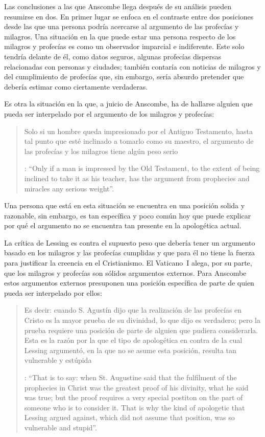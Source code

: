 Las conclusiones a las que Anscombe llega después de su análisis pueden resumirse en dos. En primer lugar se enfoca en el contraste entre dos posiciones desde las que una persona podría acercarse al argumento de las profecías y milagros. Una situación en la que puede estar una persona respecto de los milagros y profecías es como un observador imparcial e indiferente. Este solo tendría delante de él, como datos seguros, algunas profecías dispersas relacionadas con personas y ciudades; también contaría con noticias de milagros y del cumplimiento de profecías que, sin embargo, sería absurdo pretender que debería estimar como ciertamente verdaderas.

Es otra la situación en la que, a juicio de Anscombe, ha de hallarse alguien que pueda ser interpelado por el argumento de los milagros y profecías: \blockquote[{\Cite[35]{anscombe2008faith:prophandmi}}: \enquote{Only if a man is impressed by the Old Testament, to the extent of being inclined to take it as his teacher, has the argument from prophecies and miracles any serious weight}.]{Solo si un hombre queda impresionado por el Antiguo Testamento, hasta tal punto que esté inclinado a tomarlo como su maestro, el argumento de las profecías y los milagros tiene algún peso serio}. Una persona que está en esta situación se encuentra en una posición solida y razonable, sin embargo, es tan específica y poco común hoy que puede explicar por qué el argumento no se encuentra tan presente en la apologética actual.

La crítica de Lessing es contra el supuesto peso que debería tener un argumento basado en los milagros y las profecías cumplidas y que para él no tiene la fuerza para justificar la creencia en el Cristianismo. El Vaticano~I alega, por su parte, que los milagros y profecías son sólidos argumentos externos. Para Anscombe estos argumentos externos presuponen una posición específica de parte de quien pueda ser interpelado por ellos: \blockquote[{\Cite[37]{anscombe2008faith:prophandmi}}: \enquote{That is to say: when St. Augustine said that the fulfilment of the prophecies in Christ was the greatest proof of his divinity, what he said was true; but the proof requires a very special postiton on the part of someone who is to consider it. That is why the kind of apologetic that Lessing argued against, which did not assume that position, was so vulnerable and stupid}.]{Es decir: cuando S. Agustín dijo que la realización de las profecías en Cristo es la mayor prueba de su divinidad, lo que dijo es verdadero; pero la prueba requiere una posición de parte de alguien que pudiera considerarla. Esta es la razón por la que el tipo de apologética en contra de la cual Lessing argumentó, en la que no se asume esta posición, resulta tan vulnerable y estúpida}.

